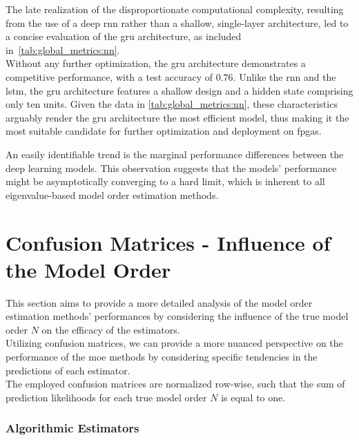 The late realization of the disproportionate computational complexity, resulting from the use of a deep \gls{rnn} rather
than a shallow, single-layer architecture, led to a concise evaluation of the \gls{gru} architecture, as included
in~\autoref{tab:global_metrics:nn}. \\
Without any further optimization, the \gls{gru} architecture demonstrates a competitive performance, with a test accuracy of \( 0.76 \).
Unlike the \gls{rnn} and the \gls{lstm}, the \gls{gru} architecture features a shallow design and a hidden state comprising
only ten units. Given the data in \autoref{tab:global_metrics:nn}, these characteristics arguably render the \gls{gru}
architecture the most efficient model, thus making it the most suitable candidate for further optimization and deployment on \glspl{fpga}.

An easily identifiable trend is the marginal performance differences between the deep learning models. This observation
suggests that the models' performance might be asymptotically converging to a hard limit, which is inherent to all
eigenvalue-based model order estimation methods. \\


\section{Confusion Matrices - Influence of the Model Order}
\label{sec:confusion_matrices}
This section aims to provide a more detailed analysis of the model order estimation methods' performances by considering
the influence of the true model order \( N \) on the efficacy of the estimators. \\
Utilizing confusion matrices, we can provide a more nuanced perspective on the performance of the \gls{moe} methods by
considering specific tendencies in the predictions of each estimator. \\
The employed confusion matrices are normalized row-wise, such that the sum of prediction likelihoods for each true model
order \( N \) is equal to one.

\subsubsection{Algorithmic Estimators}

